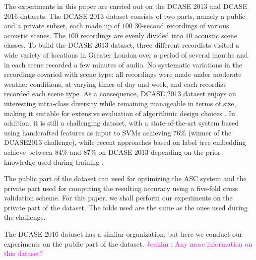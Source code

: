 \documentclass[journal]{IEEEtran}
\newcommand{\ja}[1]{\textcolor{magenta}{Joakim : #1}}
\begin{document}
The experiments in this paper are carried out on the DCASE 2013 \cite{7100934} and DCASE 2016 \cite{Mesaros2016_EUSIPCO} datasets.
The DCASE 2013 dataset consists of two parts, namely a public and a private subset, each made up of $100$ $30$-second recordings of various acoustic scenes. The $100$ recordings are evenly divided into $10$ acoustic scene classes. To build the DCASE 2013 dataset, three different recordists visited a wide variety of locations in Greater London over a period of several months and in each scene recorded a few minutes of audio. No
systematic variations in the recordings covaried with scene
type: all recordings were made under moderate weather conditions, at varying times of day and week, and each recordist recorded each scene type. As a consequence, DCASE 2013 dataset enjoys an interesting intra-class diversity while remaining manageable in terms of size, making it suitable for extensive evaluation of algorithmic design choices \cite{lagrange:hal-01082501}.
In addition, it is still a challenging dataset, with a state-of-the-art system based using handcrafted features as input to SVMs achieving $76\%$ \cite{roma2013} (winner of the DCASE2013 challenge), while recent approaches based on label tree embedding achieve between $84\%$ and $87\%$ on DCASE 2013 depending on the prior knowledge used during training \cite{phan2016label}.


The public part of the dataset can used for optimizing the ASC system and the private part used for computing the resulting accuracy using a five-fold cross validation scheme. For this paper, we shall perform our experiments on the private part of the dataset. The folds used are the same as the ones used during the challenge.

The DCASE 2016 dataset has a similar organization, but here we conduct our experiments on the public part of the dataset. \ja{Any more information on this dataset?}

\end{document}
